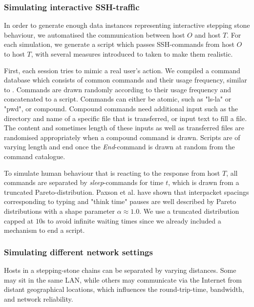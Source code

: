 \documentclass[runningheads,11pt]{llncs}\usepackage[]{graphicx}\usepackage[]{color}
\begin{document}
\subsubsection{Simulating interactive SSH-traffic}\label{Sec:Simulating_interactive}

In order to generate enough data instances representing interactive stepping stone behaviour, we automatised the communication between host $O$ and host $T$. For each simulation, we generate a script which passes SSH-commands from host $O$ to host $T$, with several measures introduced to taken to make them realistic. 

First, each session tries to mimic a real user's action. We compiled a command database which consists of common commands and their usage frequency, similar to \cite{xin2006testbed}.%
Commands are drawn randomly according to their usage frequency and concatenated to a script. 
Commands can either be atomic, such as "ls-la" or "pwd", or compound. Compound commands need additional input such as the directory and name of a specific file that is transferred, or input text to fill a file. The content and sometimes length of these inputs as well as transferred files are randomised appropriately when a compound command is drawn. Scripts are of varying length and end once the \textit{End}-command is drawn at random from the command catalogue. 


To simulate human behaviour that is reacting to the response from host $T$, all commands are separated by \textit{sleep}-commands for time $t$, which is drawn from a truncated Pareto-distribution. Paxson et al. \cite{paxson1995wide} have shown that interpacket spacings corresponding to typing and "think time" pauses are well described by Pareto distributions with a shape parameter $\alpha\approx 1.0$. We use a truncated distribution capped at $10$s to avoid infinite waiting times since we already included a mechanism to end a script.



\subsubsection{Simulating different network settings}\label{Sec:congestion}

Hosts in a stepping-stone chains can be separated by varying distances. Some may sit in the same LAN, while others may communicate via the Internet from distant geographical locations, which influences the round-trip-time, bandwidth, and network reliability. 
\end{document}
